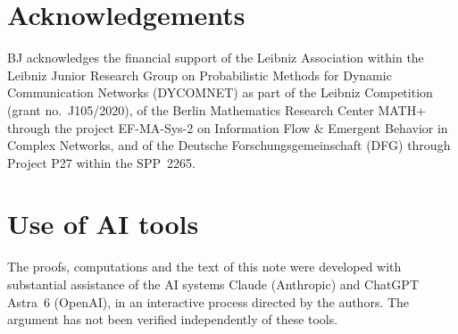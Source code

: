 \documentclass[11pt,letterpaper]{article}
\begin{document}
\section*{Acknowledgements}

BJ acknowledges the financial support of the Leibniz Association within the Leibniz Junior Research Group on Probabilistic Methods for Dynamic Communication Networks (DYCOMNET) as part of the Leibniz Competition (grant no.~J105/2020), of the Berlin Mathematics Research Center MATH+ through the project EF-MA-Sys-2 on Information Flow \& Emergent Behavior in Complex Networks, and of the Deutsche Forschungsgemeinschaft (DFG) through Project P27 within the SPP~2265.

\section*{Use of AI tools}

The proofs, computations and the text of this note were developed with substantial assistance of the AI systems Claude (Anthropic) and ChatGPT Astra~6 (OpenAI), in an interactive process directed by the authors. The argument has not been verified independently of these tools.



\end{document}
